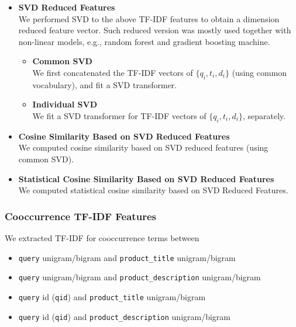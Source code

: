 \documentclass[12pt]{article}
\begin{document}
\begin{itemize}
\item \textbf{SVD Reduced Features}\\
We performed SVD to the above TF-IDF features to obtain a dimension reduced feature vector. Such reduced version was mostly used together with non-linear models, e.g., random forest and gradient boosting machine.
\begin{itemize}
\item \textbf{Common SVD}\\
We first concatenated the TF-IDF vectors of $\{q_i, t_i, d_i\}$ (using common vocabulary), and fit a SVD transformer.
\item \textbf{Individual SVD}\\
We fit a SVD transformer for TF-IDF vectors of $\{q_i, t_i, d_i\}$, separately.
\end{itemize}
\item \textbf{Cosine Similarity Based on SVD Reduced Features}\\
We computed cosine similarity based on SVD reduced features (using common SVD).
\item \textbf{Statistical Cosine Similarity Based on SVD Reduced Features}\\
We computed statistical cosine similarity based on SVD Reduced Features.
\end{itemize}
\subsubsection{Cooccurrence TF-IDF Features}
\label{subsubsec:Cooccurrence_TFIDF_Features}
We extracted TF-IDF for cooccurrence terms between
\begin{itemize}
\item \texttt{query} unigram/bigram and \texttt{product\_title} unigram/bigram
\item \texttt{query} unigram/bigram and \texttt{product\_description} unigram/bigram
\item \texttt{query} id (\texttt{qid}) and \texttt{product\_title} unigram/bigram
\item \texttt{query} id (\texttt{qid}) and \texttt{product\_description} unigram/bigram
\end{itemize}
\end{document}
